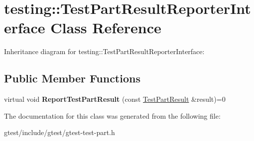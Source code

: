 \hypertarget{classtesting_1_1TestPartResultReporterInterface}{}\section{testing\+:\+:Test\+Part\+Result\+Reporter\+Interface Class Reference}
\label{classtesting_1_1TestPartResultReporterInterface}


Inheritance diagram for testing\+:\+:Test\+Part\+Result\+Reporter\+Interface\+:
\subsection*{Public Member Functions}
\begin{DoxyCompactItemize}
\item 
\mbox{\label{classtesting_1_1TestPartResultReporterInterface_aa2f920e7a5a0a6d0faf19e3727928c22}} 
virtual void {\bfseries Report\+Test\+Part\+Result} (const \hyperlink{classtesting_1_1TestPartResult}{Test\+Part\+Result} \&result)=0
\end{DoxyCompactItemize}


The documentation for this class was generated from the following file\+:\begin{DoxyCompactItemize}
\item 
gtest/include/gtest/gtest-\/test-\/part.\+h\end{DoxyCompactItemize}
